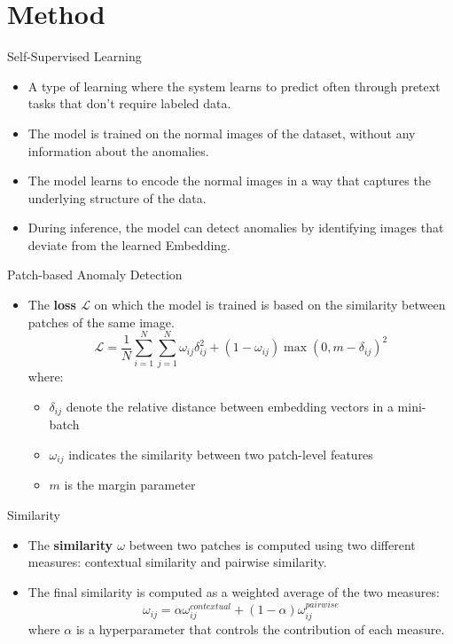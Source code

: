 \documentclass{beamer}
\begin{document}
\section{Method}
\begin{frame}{Self-Supervised Learning}
      \begin{itemize}
          \item A type of learning where the system learns to predict often through
           pretext tasks that don't require labeled data.
              \item The model is trained on the normal images of the dataset, without
               any information about the anomalies.
                  \item The model learns to encode the normal images in a way that
                   captures the underlying structure of the data.
                      \item During inference, the model can detect anomalies by
                       identifying images that deviate from the learned Embedding.
          \end{itemize}
  \end{frame}
\begin{frame}{Patch-based Anomaly Detection}
      \begin{itemize}
          \item The \textbf{loss $\mathcal{L}$} on which the model is trained is based on the similarity
           between patches of the same image.
           \begin{equation} \mathcal{L} = \frac{1}{N}\sum_{i=1}^{N} \sum_{j=1}^{N} 
            \omega_{ij}\delta_{ij}^2 + (1 - \omega_{ij})\max(0, m - \delta_{ij})^2
      \end{equation}
      where:
      \begin{itemize}
      \item $\delta_{ij}$ denote the relative distance between embedding vectors in a mini-batch
      \item $\omega_{ij}$ indicates the similarity between two patch-level features
      \item $m$ is the margin parameter
\end{itemize}
\end{itemize}
\end{frame}
\begin{frame}{Similarity}
      \begin{itemize}
              \item The \textbf{similarity $\omega$} between two patches is computed using two different
               measures: contextual similarity and pairwise similarity.
              \item The final similarity is computed as a weighted average of the two
               measures:
                  \begin{equation}
                         \omega_{ij} = \alpha\omega_{ij}^{contextual} + (1 - \alpha)\omega_{ij}^{pairwise}
                  \end{equation}
                  where $\alpha$ is a hyperparameter that controls the contribution of
                   each measure.
                  \end{itemize}
  \end{frame}
\end{document}
